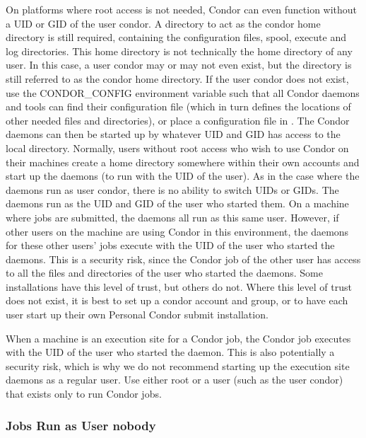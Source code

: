 On platforms where root access is not needed,
Condor can even function without a UID or GID of the user condor.
A directory to act as the condor home directory is still required,
containing the configuration files, spool,
execute and log directories.
This home directory is not technically the
home directory of any user.
In this case, a user condor may or may not even exist,
but the directory is still referred to as the condor home
directory.
If the user condor does not exist,
use the CONDOR\_CONFIG environment variable such
that all Condor daemons and tools
can find their configuration file
(which in turn defines the
locations of other needed files and directories),
or place a configuration file in .
The Condor daemons can then be started up by whatever UID and GID has
access to the local  directory.
Normally, users without root
access who wish to use Condor on their machines create a
 home directory somewhere within their own accounts
and start up the daemons (to run with the UID of the user).
As in the case where the daemons run as user condor,
there is no ability to switch UIDs or GIDs.
The daemons run as the UID and GID of the user who started them.
On a machine where jobs are submitted, the  daemons
all run as this same user.
However, if other users on the machine are using Condor in this
environment, the  daemons for these other users'
jobs execute with the UID of the user who started the daemons.
This is a security risk, since the Condor job of the other user
has access to all the files and directories of the user
who started the daemons.
Some installations have this level of trust,
but others do not.
Where this level of trust does not exist, it is best to set up a
condor account and group, or to have each user start up their own
Personal Condor submit installation.

When a machine is an execution site for a Condor job,
the Condor job executes with the UID of the user who started the
 daemon.
This is also potentially a security risk, which is why we do not
recommend starting up the execution site daemons as a regular user.
Use either root or a user (such as the user condor) that 
exists only to run Condor jobs.

\subsubsection{\label{sec:RunAsNobody}Jobs Run as User nobody}

